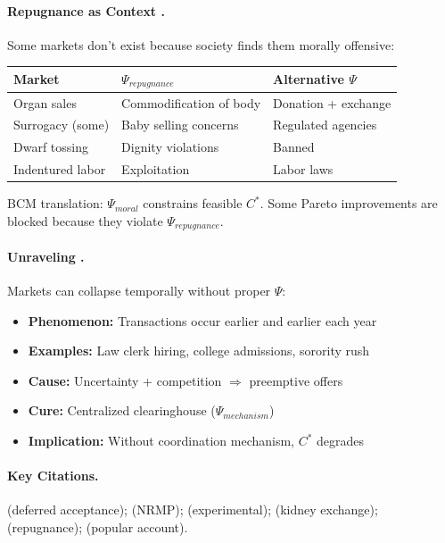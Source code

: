\paragraph{Repugnance as Context \citep{roth2007repugnance}.}
Some markets don't exist because society finds them morally offensive:
\begin{center}
\small
\begin{tabular}{@{}lll@{}}
\toprule
\textbf{Market} & \textbf{$\Psi_{repugnance}$} & \textbf{Alternative $\Psi$} \\
\midrule
Organ sales & Commodification of body & Donation + exchange \\
Surrogacy (some) & Baby selling concerns & Regulated agencies \\
Dwarf tossing & Dignity violations & Banned \\
Indentured labor & Exploitation & Labor laws \\
\bottomrule
\end{tabular}
\end{center}
BCM translation: $\Psi_{moral}$ constrains feasible $C^*$. Some Pareto improvements
are blocked because they violate $\Psi_{repugnance}$.

\paragraph{Unraveling \citep{roth1994jumping}.}
Markets can collapse temporally without proper $\Psi$:
\begin{itemize}[nosep]
    \item \textbf{Phenomenon:} Transactions occur earlier and earlier each year
    \item \textbf{Examples:} Law clerk hiring, college admissions, sorority rush
    \item \textbf{Cause:} Uncertainty + competition $\Rightarrow$ preemptive offers
    \item \textbf{Cure:} Centralized clearinghouse ($\Psi_{mechanism}$)
    \item \textbf{Implication:} Without coordination mechanism, $C^*$ degrades
\end{itemize}

\paragraph{Key Citations.}
\citet{gale1962college} (deferred acceptance); \citet{roth1984evolution} (NRMP);
\citet{roth1991game} (experimental); \citet{roth2004kidney} (kidney exchange);
\citet{roth2007repugnance} (repugnance); \citet{roth2015gets} (popular account).

